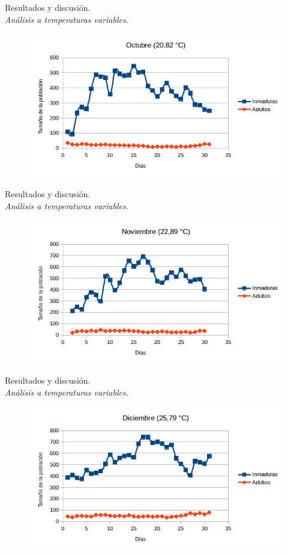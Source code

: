 \begin{frame}[t]{Resultados y discusión.\\\textit{Análisis a temperaturas variables.}}
    \begin{figure}
    \includegraphics[width=\textwidth]{./graphics/py-2010-octubre.png}
    \end{figure}
\end{frame}

\begin{frame}[t]{Resultados y discusión.\\\textit{Análisis a temperaturas variables.}}
    \begin{figure}
    \includegraphics[width=\textwidth]{./graphics/py-2010-noviembre.png}
    \end{figure}
\end{frame}

\begin{frame}[t]{Resultados y discusión.\\\textit{Análisis a temperaturas variables.}}
    \begin{figure}
    \includegraphics[width=\textwidth]{./graphics/py-2010-diciembre.png}
    \end{figure}
\end{frame}
